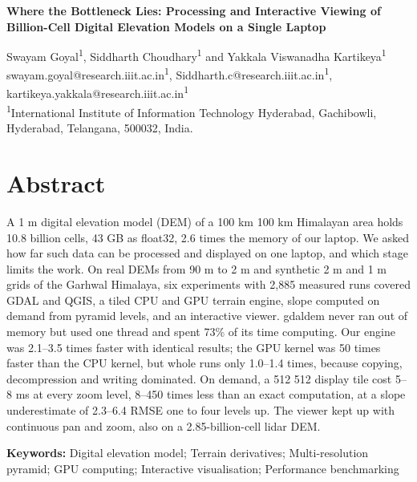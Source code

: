 \documentclass[10pt,a4paper]{article}
\begin{document}
\linenumbers
\begin{center}{\fontsize{14}{17}\selectfont\bfseries Where the Bottleneck Lies: Processing and Interactive Viewing of Billion-Cell Digital Elevation Models on a Single Laptop}\end{center}
\begin{center}Swayam Goyal\textsuperscript{1}, Siddharth Choudhary\textsuperscript{1} and Yakkala Viswanadha Kartikeya\textsuperscript{1}\\[2pt]
{\small swayam.goyal@research.iiit.ac.in\textsuperscript{1}, Siddharth.c@research.iiit.ac.in\textsuperscript{1}, kartikeya.yakkala@research.iiit.ac.in\textsuperscript{1}}\\[2pt]
{\small \textsuperscript{1}International Institute of Information Technology Hyderabad, Gachibowli, Hyderabad, Telangana, 500032, India.}\end{center}
\section*{\centering Abstract}
A 1 m digital elevation model (DEM) of a 100 km \texttimes{} 100 km Himalayan area holds 10.8 billion cells, 43 GB as float32, 2.6 times the memory of our laptop. We asked how far such data can be processed and displayed on one laptop, and which stage limits the work. On real DEMs from 90 m to 2 m and synthetic 2 m and 1 m grids of the Garhwal Himalaya, six experiments with 2,885 measured runs covered GDAL and QGIS, a tiled CPU and GPU terrain engine, slope computed on demand from pyramid levels, and an interactive viewer. gdaldem never ran out of memory but used one thread and spent 73\% of its time computing. Our engine was 2.1--3.5 times faster with identical results; the GPU kernel was 50 times faster than the CPU kernel, but whole runs only 1.0--1.4 times, because copying, decompression and writing dominated. On demand, a 512 \texttimes{} 512 display tile cost 5--8 ms at every zoom level, 8--450 times less than an exact computation, at a slope underestimate of 2.3--6.4\textdegree{} RMSE one to four levels up. The viewer kept up with continuous pan and zoom, also on a 2.85-billion-cell lidar DEM.

\textbf{Keywords:} Digital elevation model; Terrain derivatives; Multi-resolution pyramid; GPU computing; Interactive visualisation; Performance benchmarking
\end{document}
